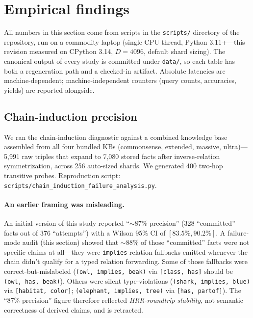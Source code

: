 \documentclass[11pt]{article}
\begin{document}
\section{Empirical findings}
\label{sec:findings}

All numbers in this section come from scripts in the
\texttt{scripts/} directory of the repository, run on a commodity
laptop (single CPU thread, Python 3.11+---this revision measured on
CPython 3.14, $D = 4096$, default shard sizing). The canonical
output of every study is committed under \texttt{data/}, so each
table has both a regeneration path and a checked-in artifact.
Absolute latencies are machine-dependent; machine-independent
counters (query counts, accuracies, yields) are reported alongside.

\subsection{Chain-induction precision}
\label{sec:chain-induction-precision}

We ran the chain-induction diagnostic against a combined knowledge
base assembled from all four bundled KBs (commonsense, extended,
massive, ultra)---5{,}991 raw triples that expand to 7{,}080 stored
facts after inverse-relation symmetrization, across 256 auto-sized
shards. We generated 400 two-hop transitive probes. Reproduction
script: \texttt{scripts/chain\_induction\_failure\_analysis.py}.

\paragraph{An earlier framing was misleading.} An initial version of
this study reported ``$\sim$87\% precision'' (328 ``committed'' facts
out of 376 ``attempts'') with a Wilson 95\% CI of $[83.5\%, 90.2\%]$.
A failure-mode audit (this section) showed that ${\sim}88\%$ of those
``committed'' facts were not specific claims at all---they were
\texttt{implies}-relation fallbacks emitted whenever the chain
didn't qualify for a typed relation forwarding. Some of those
fallbacks were correct-but-mislabeled
(\texttt{(owl, implies, beak)} via \texttt{[class, has]} should be
\texttt{(owl, has, beak)}). Others were silent type-violations
(\texttt{(shark, implies, blue)} via
\texttt{[habitat, color]};
\texttt{(elephant, implies, tree)} via \texttt{[has, partof]}). The
``87\% precision'' figure therefore reflected
\emph{HRR-roundtrip stability}, not semantic correctness of derived
claims, and is retracted.
\end{document}

